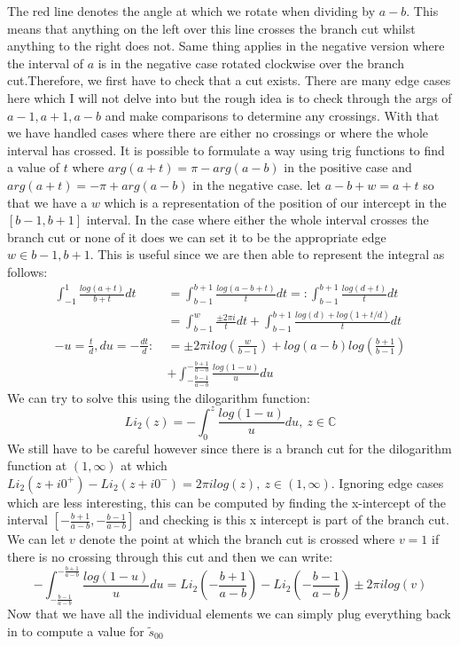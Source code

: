 \documentclass{article}
\begin{document}
The red line denotes the angle at which we rotate when dividing by $a-b$.
This means that anything on the left over this line crosses the branch cut whilst anything to the right does not.
Same thing applies in the negative version where the interval of $a$ is in the negative case rotated clockwise over the branch cut.Therefore, we first have to check that a cut exists.
There are many edge cases here which I will not delve into but the rough idea is to check through the args of $a-1,a+1,a-b$ and make comparisons to determine any crossings.
With that we have handled cases where there are either no crossings or where the whole interval has crossed.
It is possible to formulate a way using trig functions to find a value of $t$ where $arg(a+t)=\pi-arg(a-b)$ in the positive case and $arg(a+t)=-\pi+arg(a-b)$ in the negative case.
let $a-b+w=a+t$ so that we have a $w$ which is a representation of the position of our intercept in the $[b-1,b+1]$ interval.
In the case where either the whole interval crosses the branch cut or none of it does we can set it to be the appropriate edge $w\in{b-1,b+1}$. This is useful since we are then able to represent the integral as follows:
\begin{align}
    \int_{-1}^1\frac{log(a+t)}{b+t}dt&=\int_{b-1}^{b+1}\frac{log(a-b+t)}{t}dt=:\int_{b-1}^{b+1}\frac{log(d+t)}{t}dt\\
    &=\int_{b-1}^{w}\frac{\pm2\pi i}{t}dt+\int_{b-1}^{b+1}\frac{log(d)+log(1+t/d)}{t}dt\\
    -u=\frac{t}{d},du=-\frac{dt}{d}:\:&=\pm2\pi ilog(\frac{w}{b-1})+log(a-b)log(\frac{b+1}{b-1})\\
    &+\int_{-\frac{b-1}{a-b}}^{-\frac{b+1}{a-b}}\frac{log(1-u)}{u}du
\end{align}
We can try to solve this using the dilogarithm function:
$$Li_2(z) = -\int_0^z\frac{log(1-u)}{u}du,\:z\in\mathbb{C}$$
We still have to be careful however since there is a branch cut for the dilogarithm function at $(1,\infty)$ at which $Li_2(z+i0^+)-Li_2(z+i0^-) = 2\pi ilog(z),\:z\in(1,\infty)$.
Ignoring edge cases which are less interesting, this can be computed by finding the x-intercept of the interval $[-\frac{b+1}{a-b},-\frac{b-1}{a-b}]$ and checking is this x intercept is part of the branch cut.
We can let $v$ denote the point at which the branch cut is crossed where $v=1$ if there is no crossing through this cut and then we can write:
$$-\int_{-\frac{b-1}{a-b}}^{-\frac{b+1}{a-b}}\frac{log(1-u)}{u}du = Li_2(-\frac{b+1}{a-b})-Li_2(-\frac{b-1}{a-b})\pm2\pi ilog(v)$$
Now that we have all the individual elements we can simply plug everything back in to compute a value for $\tilde{s}_{00}$
\end{document}

